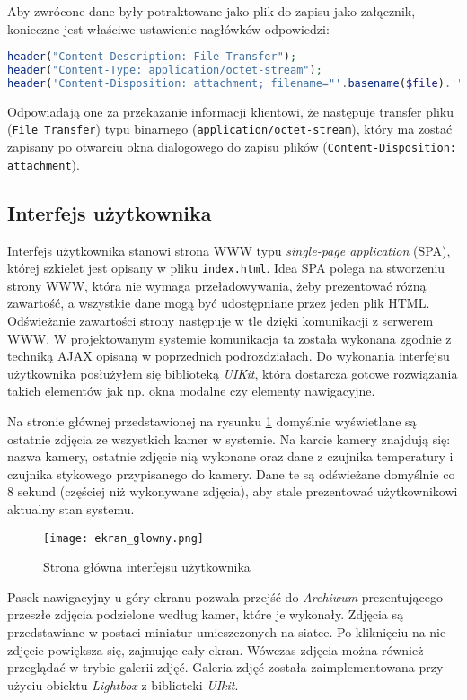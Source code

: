 \documentclass[a4paper,11pt,twoside]{article}
\begin{document}
Aby zwrócone dane były potraktowane jako plik do zapisu jako załącznik, konieczne jest właściwe ustawienie nagłówków odpowiedzi:
\begin{lstlisting}[language=PHP]
header("Content-Description: File Transfer");
header("Content-Type: application/octet-stream");
header('Content-Disposition: attachment; filename="'.basename($file).'"');
\end{lstlisting}
Odpowiadają one za przekazanie informacji klientowi, że następuje transfer pliku (\texttt{File Transfer}) typu binarnego (\texttt{application/octet-stream}), który ma zostać zapisany po otwarciu okna dialogowego do zapisu plików (\texttt{Content-Disposition: attachment}).\cite{content-disposition}\cite{mime2}

\subsection{Interfejs użytkownika}
Interfejs użytkownika stanowi strona WWW typu \textit{single-page application} (SPA), której szkielet jest opisany w pliku \texttt{index.html}. Idea SPA polega na stworzeniu strony WWW, która nie wymaga przeładowywania, żeby prezentować różną zawartość, a wszystkie dane mogą być udostępniane przez jeden plik HTML. Odświeżanie zawartości strony następuje w tle dzięki komunikacji z serwerem WWW. W projektowanym systemie komunikacja ta została wykonana zgodnie z techniką AJAX opisaną w poprzednich podrozdziałach. Do wykonania interfejsu użytkownika posłużyłem się biblioteką \textit{UIKit}, która dostarcza gotowe rozwiązania takich elementów jak np. okna modalne czy elementy nawigacyjne.

Na stronie głównej przedstawionej na rysunku \ref{fig: homepage} domyślnie wyświetlane są ostatnie zdjęcia ze wszystkich kamer w systemie. Na karcie kamery znajdują się: nazwa kamery, ostatnie zdjęcie nią wykonane oraz dane z czujnika temperatury i czujnika stykowego przypisanego do kamery. Dane te są odświeżane domyślnie co 8 sekund (częściej niż wykonywane zdjęcia), aby stale prezentować użytkownikowi aktualny stan systemu. 
\begin{figure}[H]
\begin{center}
\texttt{[image: ekran\_glowny.png]}
\caption{Strona główna interfejsu użytkownika}
\label{fig: homepage}
\end{center}
\end{figure}
Pasek nawigacyjny u góry ekranu pozwala przejść do \textit{Archiwum} prezentującego przeszłe zdjęcia podzielone według kamer, które je wykonały. Zdjęcia są przedstawiane w postaci miniatur umieszczonych na siatce. Po kliknięciu na nie zdjęcie powiększa się, zajmując cały ekran. Wówczas zdjęcia można również przeglądać w trybie galerii zdjęć. Galeria zdjęć została zaimplementowana przy użyciu obiektu \textit{Lightbox} z biblioteki \textit{UIkit}.\cite{uikit}
\end{document}
